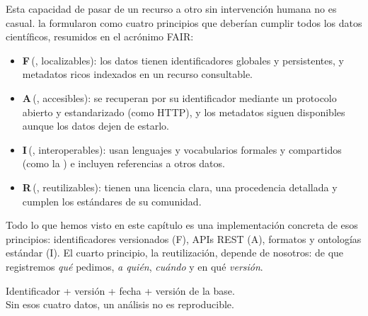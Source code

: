 Esta capacidad de pasar de un recurso a otro sin intervención humana no es casual. \textcite{c02-wilkinson2016} la formularon como cuatro principios que deberían cumplir todos los datos científicos, resumidos en el acrónimo FAIR:

\begin{itemize}
  \item \textbf{F}\,(, localizables): los datos tienen identificadores globales y persistentes, y metadatos ricos indexados en un recurso consultable.
  \item \textbf{A}\,(, accesibles): se recuperan por su identificador mediante un protocolo abierto y estandarizado (como HTTP), y los metadatos siguen disponibles aunque los datos dejen de estarlo.
  \item \textbf{I}\,(, interoperables): usan lenguajes y vocabularios formales y compartidos (como la ) e incluyen referencias a otros datos.
  \item \textbf{R}\,(, reutilizables): tienen una licencia clara, una procedencia detallada y cumplen los estándares de su comunidad.
\end{itemize}

Todo lo que hemos visto en este capítulo es una implementación concreta de esos principios: identificadores versionados (F), APIs REST (A), formatos y ontologías estándar (I). El cuarto principio, la reutilización, depende de nosotros: de que registremos \emph{qué} pedimos, \emph{a quién}, \emph{cuándo} y en qué \emph{versión}.

\begin{ideaclave}
Identificador + versión + fecha + versión de la base.\\
Sin esos cuatro datos, un análisis no es reproducible.
\end{ideaclave}


